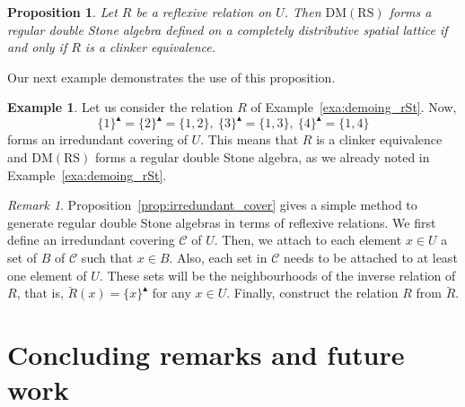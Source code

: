 \documentclass[11pt,a4paper]{amsart}
\newcommand{\UP}{\blacktriangle}
\theoremstyle{plain}
\newtheorem{proposition}[theorem]{Proposition}
\theoremstyle{definition}
\newtheorem{example}[theorem]{Example}
\theoremstyle{remark}
\newtheorem{remark}[theorem]{Remark}
\numberwithin{equation}{section}
\begin{document}
\begin{proposition} \label{cor:clinker_characterization}
Let $R$ be a reflexive relation on $U$. Then
$\mathrm{DM(RS)}$ forms a regular double Stone algebra 
defined on a completely
distributive spatial lattice if and only if $R$ is a clinker
equivalence.
\end{proposition}


 

Our next example demonstrates the use of this proposition.

\begin{example}\label{exa:regular_double_stone}
Let us consider the relation $R$ of 
Example~\ref{exa:demoing_rSt}. Now,
\[\{1\}^\UP = \{2\}^\UP = \{1,2\}, \ 
\{3\}^\UP = \{1,3\}, \ 
\{4\}^\UP = \{1,4\}
\]
forms an irredundant covering of $U$. 
This means that $R$ is a clinker equivalence and
$\mathrm{DM(RS)}$ forms a regular double Stone algebra,
as we already noted in Example~\ref{exa:demoing_rSt}.
\end{example}

\begin{remark}
Proposition~\ref{prop:irredundant_cover} gives a simple method to 
generate regular double Stone algebras in terms of reflexive relations.
We first define an irredundant covering $\mathcal{C}$ of $U$. Then, we
attach to each element $x \in U$ a set of $B$ of $\mathcal{C}$ 
such that $x \in B$. Also, each set in $\mathcal{C}$ needs to be
attached to at least one element of $U$.
These sets will be the neighbourhoods of the inverse
relation of $R$, that is, $\breve{R}(x) = \{x\}^\UP$ for any $x \in U$.
Finally, construct the relation $R$ from $\breve{R}$.
\end{remark}


\section*{Concluding remarks and future work}
\end{document}
